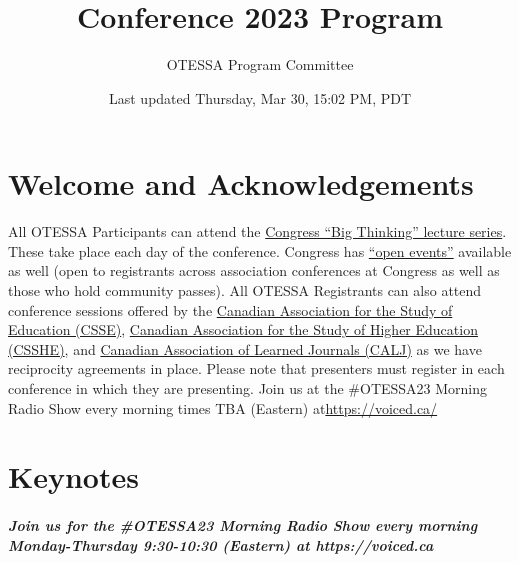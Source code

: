 \documentclass[
]{book}
\title{Conference 2023 Program}
\author{OTESSA Program Committee}
\date{Last updated Thursday, Mar 30, 15:02 PM, PDT}
\begin{document}
\maketitle

{
\setcounter{tocdepth}{1}
\tableofcontents
}
\hypertarget{welcome-and-acknowledgements}{%
\chapter*{Welcome and Acknowledgements}\label{welcome-and-acknowledgements}}

All OTESSA Participants can attend the \href{https://www.federationhss.ca/en/congress/congress-2022/open-programming}{Congress ``Big Thinking'' lecture series}. These take place each day of the conference. Congress has \href{https://www.federationhss.ca/en/congress/congress-2022/calendar-open-events}{``open events''} available as well (open to registrants across association conferences at Congress as well as those who hold community passes).
All OTESSA Registrants can also attend conference sessions offered by the \href{https://csse-scee.ca/}{Canadian Association for the Study of Education (CSSE)}, \href{https://csshe-scees.ca/}{Canadian Association for the Study of Higher Education (CSSHE)}, and \href{https://www.calj-acrs.ca/}{Canadian Association of Learned Journals (CALJ)} as we have reciprocity agreements in place. Please note that presenters must register in each conference in which they are presenting.
Join us at the \#OTESSA23 Morning Radio Show every morning times TBA (Eastern) at\url{https://voiced.ca/}

\hypertarget{keynotes}{%
\chapter*{Keynotes}\label{keynotes}}

\begin{protip}
\hypertarget{join-us-for-the-otessa23-morning-radio-show-every-morning-monday-thursday-930-1030-eastern-at-httpsvoiced.ca}{%
\paragraph{Join us for the \#OTESSA23 Morning Radio Show every morning
Monday-Thursday 9:30-10:30 (Eastern) at
https://voiced.ca}\label{join-us-for-the-otessa23-morning-radio-show-every-morning-monday-thursday-930-1030-eastern-at-httpsvoiced.ca}}
\end{protip}
\end{document}
